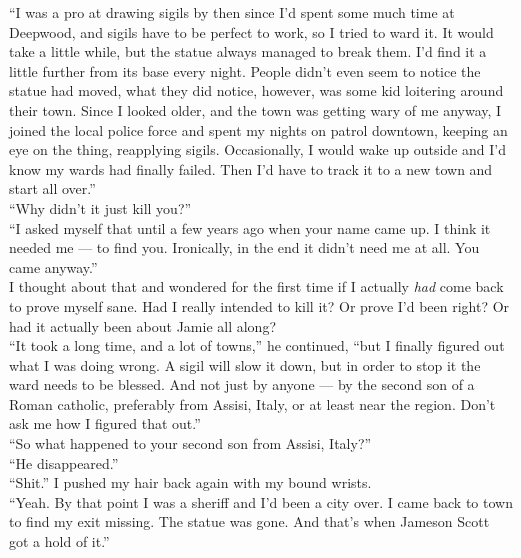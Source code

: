 \documentclass[a5paper]{scrartcl}
\begin{document}
\enquote{I was a pro at drawing sigils by then since I'd spent some much time at Deepwood, and sigils have to be perfect to work, so I tried to ward it. It would take a little while, but the statue always managed to break them. I'd find it a little further from its base every night. People didn't even seem to notice the statue had moved, what they did notice, however, was some kid loitering around their town.  Since I looked older, and the town was getting wary of me anyway, I joined the local police force and spent my nights on patrol downtown, keeping an eye on the thing, reapplying sigils. Occasionally, I would wake up outside and I'd know my wards had finally failed. Then I'd have to track it to a new town and start all over.}\\


\enquote{Why didn't it just kill you?}\\


\enquote{I asked myself that until a few years ago when your name came up. I think it needed me --- to find you. Ironically, in the end it didn't need me at all. You came anyway.}\\


I thought about that and wondered for the first time if I actually \textit{had}
 come back to prove myself sane. Had I really intended to kill it? Or prove I'd been right? Or had it actually been about Jamie all along?\\


\enquote{It took a long time, and a lot of towns,} he continued, \enquote{but I finally figured out what I was doing wrong. A sigil will slow it down, but in order to stop it the ward needs to be blessed. And not just by anyone --- by the second son of a Roman catholic, preferably from Assisi, Italy, or at least near the region. Don't ask me how I figured that out.}\\


\enquote{So what happened to your second son from Assisi, Italy?}\\


\enquote{He disappeared.}\\


\enquote{Shit.} I pushed my hair back again with my bound wrists.\\


\enquote{Yeah. By that point I was a sheriff and I'd been a city over. I came back to town to find my exit missing. The statue was gone. And that's when Jameson Scott got a hold of it.}\\
\end{document}

